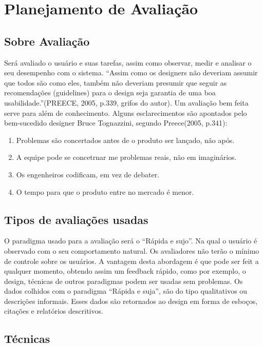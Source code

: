 \chapter[Planejamento de Avaliação]{Planejamento de Avaliação}

\section{Sobre Avaliação}

	Será avaliado o usuário e suas tarefas, assim como observar, medir e analisar o seu desempenho com o sistema. 
	“Assim como os designers não deveriam assumir que todos são como eles, também não deveriam presumir que seguir as recomendações (guidelines) para o design seja garantia de uma boa usabilidade.”(PREECE, 2005, p.339, grifos do autor).
	Um avaliação bem feita serve para além de conhecimento. Alguns esclarecimentos são apontados pelo bem-sucedido designer Bruce Tognazzini, segundo Preece(2005, p.341):

\begin{enumerate}
	\item Problemas são concertados antes de o produto ser lançado, não após.
	\item A equipe pode se concetrnar me problemas reais, não em imaginários.
	\item Os engenheiros codificam, em vez de debater.
	\item O tempo para que o produto entre no mercado é menor.
\end{enumerate}

\section{Tipos de avaliações usadas}

	O paradigma usado para a avaliação será o “Rápida e sujo”. Na qual o usuário é observado com o seu comportamento natural. Os avaliadores não terão o mínimo de controle sobre os usuários. A vantagem desta abordagem é que pode ser feit a qualquer momento, obtendo assim um feedback rápido, como por exemplo, o design, técnicas de outros paradigmas podem ser usadas sem problemas. 
	Os dados colhidos com o paradigma “Rápida e suja”, são do tipo qualitativos ou descrições informais. Esses dados são retornados ao design em forma de esboços, citações e relatórios descritivos.

\section{Técnicas} 

